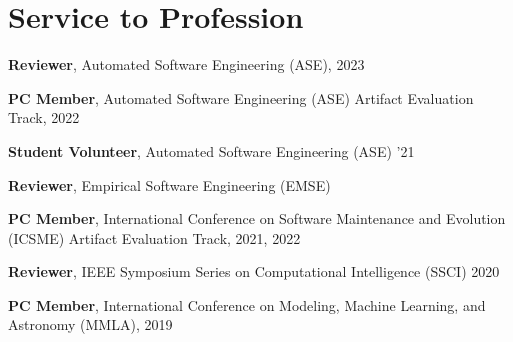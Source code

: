 \section{Service to Profession}
 \resumeSubHeadingListStart
    \item
      {\textbf{Reviewer}, Automated Software Engineering (ASE), 2023}
    \item
      {\textbf{PC Member}, Automated Software Engineering (ASE) Artifact Evaluation Track, 2022}
    \item
      {\textbf{Student Volunteer}, Automated Software Engineering (ASE) '21}
    \item
      {\textbf{Reviewer}, Empirical Software Engineering (EMSE)}
    \item
      {\textbf{PC Member}, International Conference on Software Maintenance and Evolution (ICSME) Artifact Evaluation Track, 2021, 2022}
    \item
      {\textbf{Reviewer}, IEEE Symposium Series on Computational Intelligence (SSCI) 2020}
    \item
      {\textbf{PC Member}, International Conference on Modeling, Machine Learning, and Astronomy (MMLA), 2019}
 \resumeSubHeadingListEnd